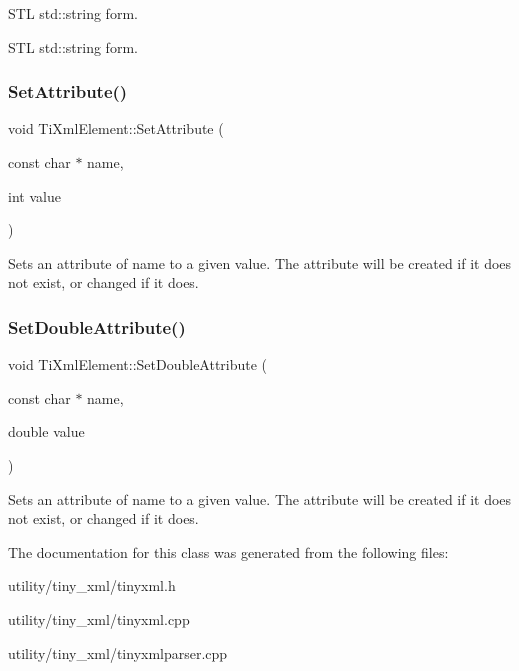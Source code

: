 S\+TL std\+::string form. 

S\+TL std\+::string form. \mbox{\label{class_ti_xml_element_ace6f4be75e373726d4774073d666d1a7}} 
\subsubsection{\texorpdfstring{Set\+Attribute()}{SetAttribute()}\hspace{0.1cm}{\footnotesize\ttfamily [3/3]}}
{\footnotesize\ttfamily void Ti\+Xml\+Element\+::\+Set\+Attribute (\begin{DoxyParamCaption}\item[{const char $\ast$}]{name,  }\item[{int}]{value }\end{DoxyParamCaption})}

Sets an attribute of name to a given value. The attribute will be created if it does not exist, or changed if it does. \mbox{\label{class_ti_xml_element_a0d1dd975d75496778177e35abfe0ec0b}} 
\subsubsection{\texorpdfstring{Set\+Double\+Attribute()}{SetDoubleAttribute()}}
{\footnotesize\ttfamily void Ti\+Xml\+Element\+::\+Set\+Double\+Attribute (\begin{DoxyParamCaption}\item[{const char $\ast$}]{name,  }\item[{double}]{value }\end{DoxyParamCaption})}

Sets an attribute of name to a given value. The attribute will be created if it does not exist, or changed if it does. 

The documentation for this class was generated from the following files\+:\begin{DoxyCompactItemize}
\item 
utility/tiny\+\_\+xml/tinyxml.\+h\item 
utility/tiny\+\_\+xml/tinyxml.\+cpp\item 
utility/tiny\+\_\+xml/tinyxmlparser.\+cpp\end{DoxyCompactItemize}
